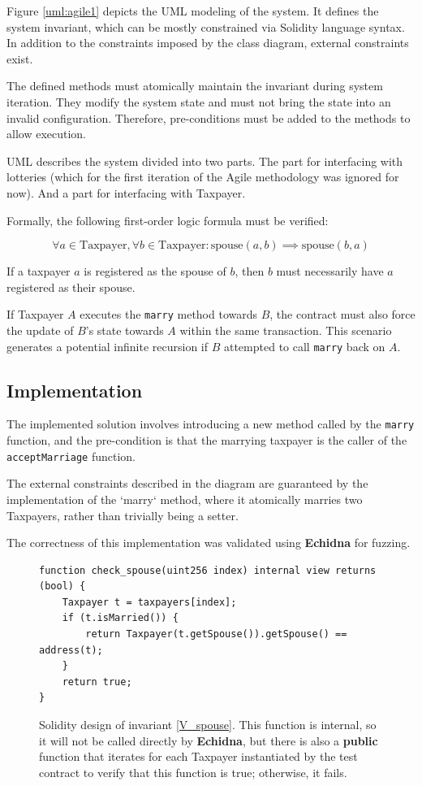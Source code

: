 \documentclass[conference]{IEEEtran}
\begin{document}
Figure \ref{uml:agile1} depicts the UML modeling of the system.
It defines the system invariant, which can be mostly constrained via Solidity language syntax.
In addition to the constraints imposed by the class diagram, external constraints exist.

The defined methods must atomically maintain the invariant during system iteration. They modify the system state and
must not bring the state into an invalid configuration.
Therefore, pre-conditions must be added to the methods to allow execution.

UML describes the system divided into two parts.
The part for interfacing with lotteries (which for the first iteration of the Agile methodology was ignored for now).
And a part for interfacing with Taxpayer.

Formally, the following first-order logic formula must be verified:

\begin{equation}
	\label{V_spouse}
	\forall a \in \text{Taxpayer}, \forall b \in \text{Taxpayer}: \text{spouse}(a,b) \implies \text{spouse}(b,a)
\end{equation}

If a taxpayer $a$ is registered as the spouse of $b$, then $b$ must necessarily have $a$ registered as their spouse.

If Taxpayer $A$ executes the \texttt{marry} method towards $B$, the contract must also force the update
of $B$'s state towards $A$ within the same transaction. This scenario generates a potential infinite recursion
if $B$ attempted to call \texttt{marry} back on $A$.

\subsection{Implementation}

The implemented solution involves introducing a new method called by the \texttt{marry} function,
and the pre-condition is that the marrying taxpayer is the caller of the \texttt{acceptMarriage} function.

The external constraints described in the diagram are guaranteed by the implementation of the `marry` method, where it atomically
marries two Taxpayers, rather than trivially being a setter.

The correctness of this implementation was validated using \textbf{Echidna} for fuzzing.

\begin{figure}
	\centering
	\begin{lstlisting}[style=soliditystyle]
function check_spouse(uint256 index) internal view returns (bool) {
    Taxpayer t = taxpayers[index];
    if (t.isMarried()) {
        return Taxpayer(t.getSpouse()).getSpouse() == address(t);
    }
    return true;
}
\end{lstlisting}
	\caption{Solidity design of invariant \ref{V_spouse}. This function is internal, so it will not be called directly
		by \textbf{Echidna}, but there is also a \textbf{public} function that iterates for each Taxpayer
		instantiated by the test contract to verify that this function is true; otherwise, it fails.}
	\label{code:V_spouse}
\end{figure}
\end{document}
